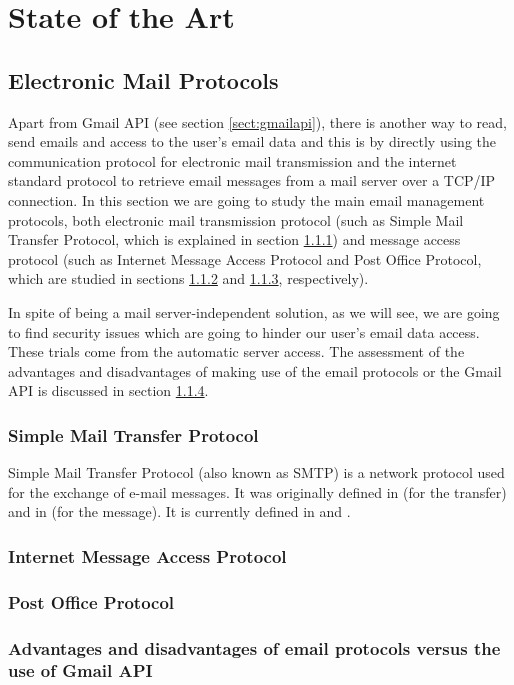 \chapter{State of the Art}
\label{cap:estadoDeLaCuestion}



\section{Electronic Mail Protocols}
Apart from Gmail API (see section \ref{sect:gmailapi}), there is another way to read, send emails and access to the user's email data and this is by directly using the communication protocol for electronic mail transmission and the internet standard protocol to retrieve email messages from a mail server over a TCP/IP connection. In this section we are going to study the main email management protocols, both electronic mail transmission protocol (such as Simple Mail Transfer Protocol, which is explained in section \ref{ssect:smtp}) and message access protocol (such as Internet Message Access Protocol and Post Office Protocol, which are studied in sections \ref{ssect:imap} and \ref{ssect:pop}, respectively).

In spite of being a mail server-independent solution, as we will see, we are going to find security issues which are going to hinder our user's email data access. These trials come from the automatic server access. The assessment of the advantages and disadvantages of making use of the email protocols or the Gmail API is discussed in section \ref{ssect:protvsapi}.

\subsection{Simple Mail Transfer Protocol} \label{ssect:smtp}
Simple Mail Transfer Protocol (also known as SMTP) is a network protocol used for the exchange of e-mail messages. It was originally defined in \cite{rfc821} (for the transfer) and in \cite{rfc822} (for the message). It is currently defined in \cite{rfc5321} and \cite{rfc5322}.

\subsection{Internet Message Access Protocol} \label{ssect:imap}

\subsection{Post Office Protocol} \label{ssect:pop}

\subsection{Advantages and disadvantages of email protocols versus the use of Gmail API} \label{ssect:protvsapi}

